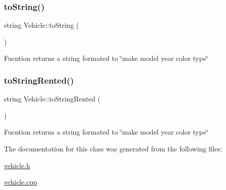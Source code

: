 \subsubsection{\texorpdfstring{to\+String()}{toString()}}
{\footnotesize\ttfamily string Vehicle\+::to\+String (\begin{DoxyParamCaption}{ }\end{DoxyParamCaption})}

Fucntion returns a string formated to \char`\"{}make model year color type\char`\"{} \mbox{\label{class_vehicle_aa614254249eb1f1c0221b782c47d269e}} 
\subsubsection{\texorpdfstring{to\+String\+Rented()}{toStringRented()}}
{\footnotesize\ttfamily string Vehicle\+::to\+String\+Rented (\begin{DoxyParamCaption}{ }\end{DoxyParamCaption})}

Fucntion returns a string formated to \char`\"{}make model year color type\char`\"{} 

The documentation for this class was generated from the following files\+:\begin{DoxyCompactItemize}
\item 
\hyperlink{vehicle_8h}{vehicle.\+h}\item 
\hyperlink{vehicle_8cpp}{vehicle.\+cpp}\end{DoxyCompactItemize}
